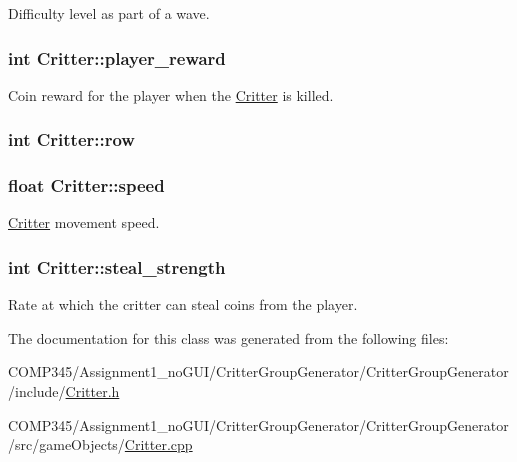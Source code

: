 Difficulty level as part of a wave. 

\hypertarget{class_critter_a2a17f7366fbde83714742e66ba3e63a7}{
\subsubsection[{player\+\_\+reward}]{\setlength{\rightskip}{0pt plus 5cm}int Critter\+::player\+\_\+reward\hspace{0.3cm}{\ttfamily [protected]}}}\label{class_critter_a2a17f7366fbde83714742e66ba3e63a7}


Coin reward for the player when the \hyperlink{class_critter}{Critter} is killed. 

\hypertarget{class_critter_aec02dae27ba8081064ac2b035eaf82cf}{
\subsubsection[{row}]{\setlength{\rightskip}{0pt plus 5cm}int Critter\+::row}}\label{class_critter_aec02dae27ba8081064ac2b035eaf82cf}
\hypertarget{class_critter_adde7d84a0dd9ac8f5dc144464928638f}{
\subsubsection[{speed}]{\setlength{\rightskip}{0pt plus 5cm}float Critter\+::speed\hspace{0.3cm}{\ttfamily [protected]}}}\label{class_critter_adde7d84a0dd9ac8f5dc144464928638f}


\hyperlink{class_critter}{Critter} movement speed. 

\hypertarget{class_critter_a60f7c436aec1f6a63d4fb5af57eb8eef}{
\subsubsection[{steal\+\_\+strength}]{\setlength{\rightskip}{0pt plus 5cm}int Critter\+::steal\+\_\+strength\hspace{0.3cm}{\ttfamily [protected]}}}\label{class_critter_a60f7c436aec1f6a63d4fb5af57eb8eef}


Rate at which the critter can steal coins from the player. 



The documentation for this class was generated from the following files\+:\begin{DoxyCompactItemize}
\item 
C\+O\+M\+P345/\+Assignment1\+\_\+no\+G\+U\+I/\+Critter\+Group\+Generator/\+Critter\+Group\+Generator/include/\hyperlink{_critter_8h}{Critter.\+h}\item 
C\+O\+M\+P345/\+Assignment1\+\_\+no\+G\+U\+I/\+Critter\+Group\+Generator/\+Critter\+Group\+Generator/src/game\+Objects/\hyperlink{_critter_8cpp}{Critter.\+cpp}\end{DoxyCompactItemize}
